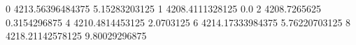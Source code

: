 0 4213.56396484375 5.15283203125
1 4208.4111328125 0.0
2 4208.7265625 0.3154296875
4 4210.4814453125 2.0703125
6 4214.17333984375 5.76220703125
8 4218.21142578125 9.80029296875
